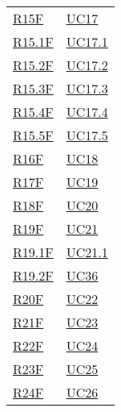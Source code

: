 \begin{center}
\begin{longtable}[!h]{p{50px} p{50px}}
        \hyperref[tab:RequisitiFunzionali]{R15F}   & \hyperref[sec:UC17]{UC17}                      \\
        \hyperref[tab:RequisitiFunzionali]{R15.1F} & \hyperref[sec:UC17]{UC17.1}                    \\
        \hyperref[tab:RequisitiFunzionali]{R15.2F} & \hyperref[sec:UC17]{UC17.2}                    \\
        \hyperref[tab:RequisitiFunzionali]{R15.3F} & \hyperref[sec:UC17]{UC17.3}                    \\
        \hyperref[tab:RequisitiFunzionali]{R15.4F} & \hyperref[sec:UC17]{UC17.4}                    \\
        \hyperref[tab:RequisitiFunzionali]{R15.5F} & \hyperref[sec:UC17]{UC17.5}                    \\
        \hyperref[tab:RequisitiFunzionali]{R16F}   & \hyperref[sec:UC18]{UC18}                      \\
        \hyperref[tab:RequisitiFunzionali]{R17F}   & \hyperref[sec:UC19]{UC19}                      \\
        \hyperref[tab:RequisitiFunzionali]{R18F}   & \hyperref[sec:UC20]{UC20}                      \\
        \hyperref[tab:RequisitiFunzionali]{R19F}   & \hyperref[sec:UC21]{UC21}                      \\
        \hyperref[tab:RequisitiFunzionali]{R19.1F} & \hyperref[sec:UC21.1]{UC21.1}                  \\
        \hyperref[tab:RequisitiFunzionali]{R19.2F} & \hyperref[sec:UC36]{UC36}                      \\
        \hyperref[tab:RequisitiFunzionali]{R20F}   & \hyperref[sec:UC22]{UC22}                      \\
        \hyperref[tab:RequisitiFunzionali]{R21F}   & \hyperref[sec:UC23]{UC23}                      \\
        \hyperref[tab:RequisitiFunzionali]{R22F}   & \hyperref[sec:UC24]{UC24}                      \\
        \hyperref[tab:RequisitiFunzionali]{R23F}   & \hyperref[sec:UC25]{UC25}                      \\
        \hyperref[tab:RequisitiFunzionali]{R24F}   & \hyperref[sec:UC26]{UC26}                      \\

\end{longtable}
\end{center}
